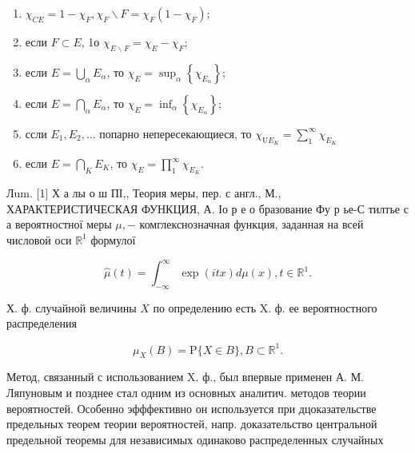 \documentclass[10pt]{article}
\begin{document}
\begin{enumerate}

  \item $\chi_{C E}=1-\chi_{F}, \chi_{F} \backslash F=\chi_{F}\left(1-\chi_{F}\right)$;



  \item если $F \subset E$, 1о $\chi_{E \backslash F}=\chi_{E}-\chi_{F}$;



  \item если $E=\bigcup_{\alpha} E_{\alpha}$, то $\chi_{E}=\sup _{\alpha}\left\{\chi_{E_{\alpha}}\right\}$;



  \item если $E=\bigcap_{\alpha} E_{\alpha}$, то $\chi_{E}=\inf _{\alpha}\left\{\chi_{E_{\alpha}}\right\}$;



  \item ссли $E_{1}, E_{2}, \ldots$ попарно непересекающиеся, то $\chi_{\mathrm{U} E_{K}}=\sum_{1}^{\infty} \chi_{E_{K}}$



  \item если $E=\bigcap_{K} E_{K}$, то $\chi_{E}=\prod_{1}^{\infty} \chi_{E_{K}}$.



\end{enumerate}



Лum. [1] Х а лы о ш ПІ,, Теория меры, пер. с англ., М., ХАРАКТЕРИСТИЧЕСКАЯ ФУНКЦИЯ, А. Іо р е о бразование Фу р ье-С тилтье с а вероятностної меры $\mu,-$ комглекснозначная функция, заданная на всей числовоӥ оси $\mathbb{R}^{1}$ формулої



\[

\hat{\mu}(t)=\int_{-\infty}^{\infty} \exp (i t x) d \mu(x), t \in \mathbb{R}^{1} .

\]



Х. ф. случайной величины $X$ по определению есть $\mathrm{X}$. ф. ее вероятностного распределения



\[

\mu_{X}(B)=\mathrm{P}\{X \in B\}, B \subset \mathbb{R}^{1} .

\]



Метод, связанный с использованием X. ф., был впервые применен А. М. Ляпуновым и позднее стал одним из основных аналитич. методов теории вероятностей. Особенно эфффективно он используется при дцоказательстве предельных теорем теории вероятностей, напр. доказательство центральной предельной теоремы для независимых одинаково распределенных случайных
\end{document}
